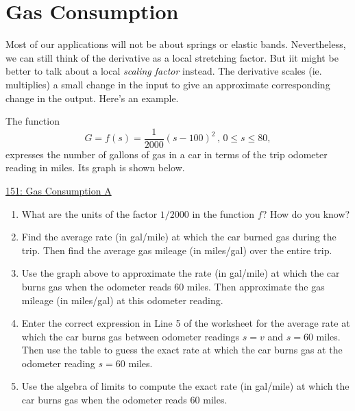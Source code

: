 \documentclass{ximera}
\begin{document}
\section{Gas Consumption}
Most of our applications will not be about springs or elastic bands. Nevertheless, we can still think of the derivative as a local stretching factor. But iit might be better to talk about a local \emph{scaling factor} instead. The derivative scales (ie. multiplies) a small change in the input to give an approximate corresponding change in the output. Here's an example.

\begin{example} \label{Ex:987GHEjerf}
The function
\[
    G = f(s) = \frac{1}{2000}(s-100)^2 \, , \, 0\leq s \leq 80,
\]
expresses the number of gallons of gas in a car in terms of the trip odometer reading in miles. Its graph is shown below.

\begin{onlineOnly}
    \begin{center}
\end{center}
\end{onlineOnly}

\href{https://www.desmos.com/calculator/wdnmaszvgb}{151: Gas Consumption A}

\begin{enumerate}
\item What are the units of the factor $1/2000$ in the function $f$? How do you know?

\item Find the average rate (in gal/mile) at which the car burned gas during the trip. Then find the average gas mileage (in miles/gal) over the entire trip.

\item Use the graph above to approximate the rate (in gal/mile) at which the car burns gas when the odometer reads $60$ miles. Then approximate the gas mileage (in miles/gal) at this odometer reading.

\item Enter the correct expression in Line 5 of the worksheet for the average rate at which the car burns gas between odometer readings $s=v$ and $s=60$ miles. Then use the table to guess the exact rate at which the car burns gas at the odometer reading $s=60$ miles. %

\item Use the algebra of limits to compute the exact rate (in gal/mile) at which the car burns gas when the odometer reads $60$ miles.


\end{enumerate}
\end{example}
\end{document}
